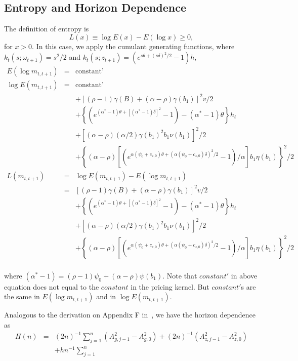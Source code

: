 \documentclass[11pt,reqno,final]{amsart}
\begin{document}
\subsection{Entropy and Horizon Dependence}
The definition of entropy is
$$
L(x) \equiv \log E(x) - E(\log x) \geq 0,
$$
for $x>0$. In this case, we apply the cumulant generating functions, where $k_t(s;\omega_{t+1})=s^2/2$ and $k_t(s;z_{t+1})=(e^{s\theta+(s\delta)^2/2}-1)h$, 
\begin{eqnarray*} 
E(\log m_{t,t+1}) &=& \textrm{constant'} \\
\log E(m_{t,t+1}) &=& \textrm{constant'} \\
                  & & + [(\rho-1)\gamma(B)+(\alpha-\rho)\gamma(b_1)]^2 v / 2 \\
                  & & + \left\{ \left( e^{(\alpha^*-1)\theta+[(\alpha^*-1)\delta]^2} -1 \right) -\left(\alpha^*-1\right)\theta \right\} h_t  \\
                  & & + [(\alpha-\rho) (\alpha/2)\gamma(b_1)^2 b_1\nu(b_1)]^2 /2 \\
                  & & + \left\{(\alpha-\rho) [(e^{\alpha(\psi_0+c_{z,0})\theta+(\alpha(\psi_0+c_{z,0})\delta)^2/2}-1)/\alpha]b_1\eta(b_1)\right\}^2 / 2 \\
L(m_{t,t+1})      &=& \log E(m_{t,t+1}) - E(\log m_{t,t+1})\\
                  &=& [(\rho-1)\gamma(B)+(\alpha-\rho)\gamma(b_1)]^2 v / 2 \\
                  & & + \left\{ \left( e^{(\alpha^*-1)\theta+[(\alpha^*-1)\delta]^2} -1 \right) -\left(\alpha^*-1\right)\theta \right\} h_t  \\
                  & & + [(\alpha-\rho) (\alpha/2)\gamma(b_1)^2 b_1\nu(b_1)]^2 /2 \\
                  & & + \left\{(\alpha-\rho) [(e^{\alpha(\psi_0+c_{z,0})\theta+(\alpha(\psi_0+c_{z,0})\delta)^2/2}-1)/\alpha]b_1\eta(b_1)\right\}^2 / 2 \\
\end{eqnarray*}

where $(\alpha^*-1) = (\rho-1)\psi_0 +(\alpha-\rho)\psi(b_1)$. Note that $constant'$ in above equation does not equal to the $constant$ in the pricing kernel. But $constant'$s are the same in $E(\log m_{t,t+1})$ and in $\log E(m_{t,t+1})$.

Analogous to the derivation on Appendix F in~\cite{BCZ14}, we have the horizon dependence as
\begin{eqnarray*}
H(n) &=& (2n)^{-1} \sum_{j=1}^n (A_{g,j-1}^2 - A_{g,0}^2) +  (2n)^{-1}(A_{z,j-1}^2 - A_{z,0}^2) \\
     & & + hn^{-1} \sum_{j=1}^n 
\end{eqnarray*}
\end{document}
